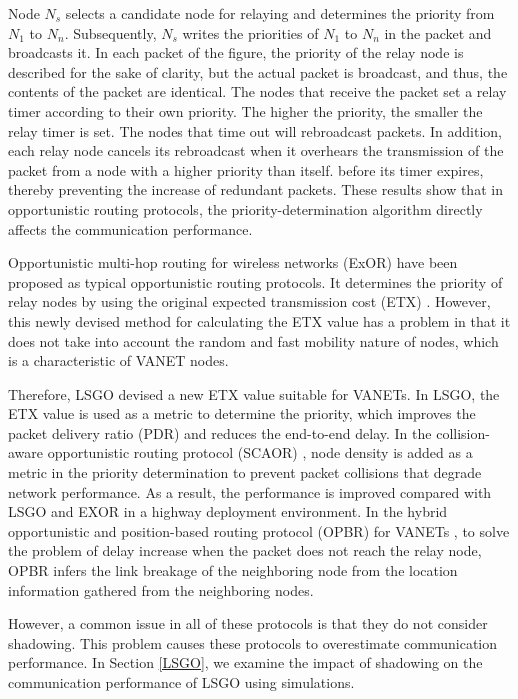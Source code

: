 \documentclass[conference]{IEEEtran}
\begin{document}
Node $N_{s}$ selects a candidate node for relaying and determines the priority from $N_{1}$ to $N_{n}$. Subsequently, $N_{s}$ writes the priorities of $N_{1}$ to $N_{n}$ in the packet and broadcasts it. 
In each packet of the figure, the priority of the relay node is described for the sake of clarity, but the actual packet is broadcast, and thus, the contents of the packet are identical. 
The nodes that receive the packet set a relay timer according to their own priority.
The higher the priority, the smaller the relay timer is set.
The nodes that time out will rebroadcast packets.
In addition, each relay node cancels its rebroadcast when it overhears the transmission of the packet from a node with a higher priority than itself.
before its timer expires, thereby preventing the increase of redundant packets.
These results show that in opportunistic routing protocols, the priority-determination algorithm directly affects  the communication performance.


Opportunistic multi-hop routing for wireless
networks (ExOR) \cite{16} have been proposed as typical opportunistic routing protocols. It determines the priority of relay nodes by using the original expected transmission cost (ETX) \cite{21}. However, this newly devised method for calculating the ETX value has a problem in that it does not take into account the random and fast mobility nature of nodes, which is a characteristic of VANET nodes.\par


Therefore, LSGO devised a new ETX value suitable for VANETs. In LSGO, the ETX value is used as a metric to determine the priority, which improves the packet delivery ratio (PDR) and reduces the end-to-end delay.
In the collision-aware opportunistic routing protocol (SCAOR) \cite{22}, node density is added as a metric in the priority determination to prevent packet collisions that degrade network performance. 
As a result, the performance is improved compared with LSGO and EXOR in a highway deployment environment. 
In the hybrid opportunistic and position-based routing protocol (OPBR) for VANETs
\cite{23}, to solve the problem of delay increase when the packet does not reach the relay node, OPBR infers the link breakage of the neighboring node from the location information gathered from the neighboring nodes.


However, a  common issue in all of these protocols is that they do not consider shadowing.
This problem causes these protocols to overestimate communication performance. In Section \ref{LSGO}, we examine the impact of shadowing on the communication performance of LSGO using simulations. 
\end{document}
